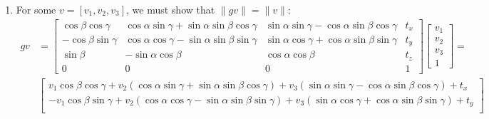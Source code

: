 \documentclass[12pt]{article}
\begin{document}
\begin{enumerate}
\begin{align*}
\begin{bmatrix}
	\cos\beta \cos\gamma & \cos\alpha \sin\gamma+ \sin\alpha \sin\beta \cos\gamma & \sin\alpha \sin\gamma - \cos\alpha \sin\beta \cos\gamma & 0 \\
	-\cos\beta \sin\gamma & \cos\alpha \cos\gamma - \sin\alpha \sin\beta \sin\gamma & \sin\alpha \cos\gamma + \cos\alpha \sin\beta \sin\gamma & 0 \\
	\sin\beta & -\sin\alpha \cos\beta & \cos\alpha\cos\beta & 0 \\
	0 & 0 & 0 & 1 \end{bmatrix} \\
	&= \begin{bmatrix} \cos\beta \cos\gamma & \cos\alpha \sin\gamma+ \sin\alpha \sin\beta \cos\gamma & \sin\alpha \sin\gamma - \cos\alpha \sin\beta \cos\gamma & t_x \\
	-\cos\beta \sin\gamma & \cos\alpha \cos\gamma - \sin\alpha \sin\beta \sin\gamma & \sin\alpha \cos\gamma + \cos\alpha \sin\beta \sin\gamma & t_y \\
	\sin\beta & -\sin\alpha \cos\beta & \cos\alpha\cos\beta & t_z \\
	0 & 0 & 0 & 1 \end{bmatrix}
	\end{align*}
	\item[(a)] For some $v = [v_1, v_2, v_3]$, we must show that $\|gv\| = \|v\|$:
	\begin{align*}
	gv &= \begin{bmatrix} \cos\beta \cos\gamma & \cos\alpha \sin\gamma + \sin\alpha \sin\beta \cos\gamma & \sin\alpha \sin\gamma - \cos\alpha \sin\beta \cos\gamma & t_x \\
	-\cos\beta \sin\gamma & \cos\alpha \cos\gamma - \sin\alpha \sin\beta \sin\gamma & \sin\alpha \cos\gamma + \cos\alpha \sin\beta \sin\gamma & t_y \\
	\sin\beta & -\sin\alpha \cos\beta & \cos\alpha\cos\beta & t_z \\
	0 & 0 & 0 & 1 \end{bmatrix} \begin{bmatrix} v_1 \\ v_2 \\ v_3 \\ 1 \end{bmatrix} = \\
	&\begin{bmatrix}
	v_1\cos\beta\cos\gamma + v_2 (\cos\alpha \sin\gamma + \sin\alpha \sin\beta \cos\gamma)  + v_3 (\sin\alpha \sin\gamma - \cos\alpha \sin\beta \cos\gamma) + t_x \\
	- v_1 \cos\beta \sin\gamma + v_2 (\cos\alpha \cos\gamma - \sin\alpha \sin\beta \sin\gamma) + v_3 ( \sin\alpha \cos\gamma + \cos\alpha \sin\beta \sin\gamma) + t_y \\

\end{bmatrix}
\end{align*}
\end{enumerate}
\end{document}
